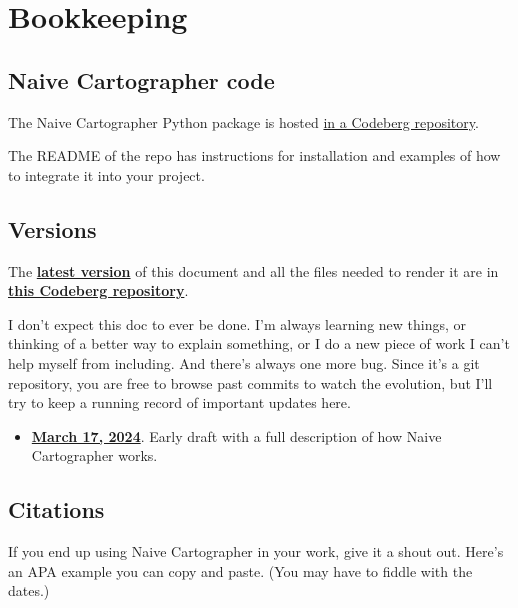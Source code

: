 \section{Bookkeeping}
\label{sec:bookkeeping}

\subsection{Naive Cartographer code}
\label{subsec:code}

The Naive Cartographer Python package is hosted
\href{
https://codeberg.org/brohrer/cartographer
}{in a Codeberg repository}.

The README of the repo has instructions for installation and
examples of how to integrate it into your project.

\subsection{Versions}
\label{subsec:versions}

The \textbf{\href{
https://codeberg.org/brohrer/cartographer-paper/src/branch/main/cartographer.pdf}
{latest version}}
of this document and all the files needed to
render it are in \textbf{\href{
https://codeberg.org/brohrer/cartographer-paper}
{this Codeberg repository}}.

I don't expect this doc to ever be done. I'm always learning new things,
or thinking of a better way to explain something, or I do a new
piece of work I can't help myself from including. And there's always
one more bug.
Since it's a git repository, you are free to browse past commits to watch
the evolution, but I'll try to keep a running record of important updates
here.
\begin{itemize}
\item{\textbf{\href{
https://codeberg.org/brohrer/cartographer-paper/src/commit/501c4a381f2209e39cb48df58257689137d3cacc/cartographer.pdf}
{March 17, 2024}}. Early draft with a full description of how Naive Cartographer works.}
\end{itemize}

\subsection{Citations}
\label{subsec:citations}

If you end up using Naive Cartographer in your work, give it a shout out.
Here's an APA example you can copy and paste. (You may have to fiddle with
the dates.)

